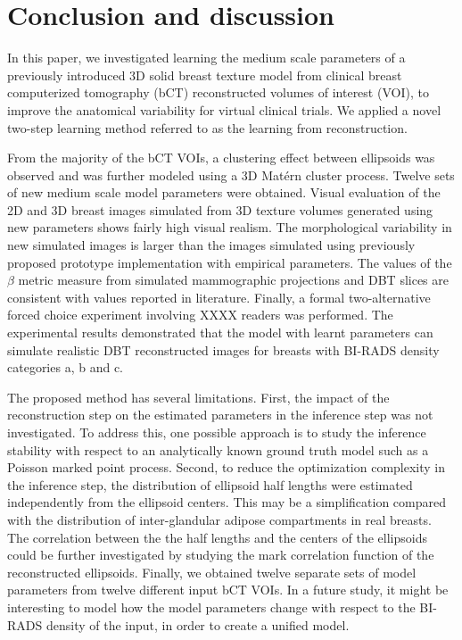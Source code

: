 \documentclass[journal]{IEEEtran}
\begin{document}
\section{Conclusion and discussion}
\label{sec:concl-disc}

In this paper, we investigated learning the medium scale parameters of
a previously introduced 3D solid breast texture model from clinical
breast computerized tomography (bCT) reconstructed volumes of interest
(VOI), to improve the anatomical variability for virtual clinical
trials. We applied a novel two-step learning method referred to as the
learning from reconstruction.

From the majority of the bCT VOIs, a clustering effect between
ellipsoids was observed and was further modeled using a 3D Mat\'{e}rn
cluster process. Twelve sets of new medium scale model parameters were
obtained. Visual evaluation of the 2D and 3D breast
images simulated from 3D texture volumes generated using new
parameters shows fairly high visual realism. The morphological
variability in new simulated images is larger than the images
simulated using previously proposed prototype implementation with
empirical parameters. The values of the $\beta$ metric measure from
simulated mammographic projections and DBT slices are consistent with
values reported in literature. Finally, a formal two-alternative
forced choice experiment involving XXXX readers was performed. The
experimental results demonstrated that the model with learnt
parameters can simulate realistic DBT reconstructed images for breasts
with BI-RADS density categories a, b and c.

The proposed method has several limitations. First, the impact of the
reconstruction step on the estimated parameters in the inference step
was not investigated. To address this, one possible approach is to
study the inference stability with respect to an analytically known
ground truth model such as a Poisson marked point process. Second, to
reduce the optimization complexity in the inference step, the
distribution of ellipsoid half lengths were estimated independently
from the ellipsoid centers. This may be a simplification compared with
the distribution of inter-glandular adipose compartments in real
breasts. The correlation between the the half lengths and the centers
of the ellipsoids could be further investigated by studying the mark
correlation function of the reconstructed ellipsoids. Finally, we
obtained twelve separate sets of model parameters from twelve
different input bCT VOIs. In a future study, it might be interesting
to model how the model parameters change with respect to the BI-RADS
density of the input, in order to create a unified model.
\end{document}
